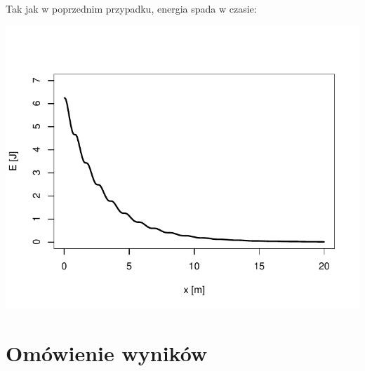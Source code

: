 \documentclass[12pt]{sprawozdanie}
\begin{document}
Tak jak w poprzednim przypadku, energia spada w czasie:

\begin{center}\includegraphics{info2_files/figure-latex/nonlinear-dump-energy-1} \end{center}

\hypertarget{omowienie-wynikow}{%
\section{Omówienie wyników}\label{omowienie-wynikow}}
\end{document}
